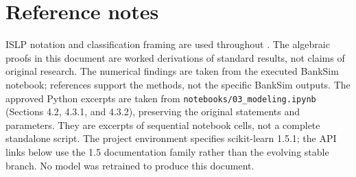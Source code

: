 \documentclass[11pt,a4paper]{article}
\begin{document}
\section*{Reference notes}
ISLP notation and classification framing are used throughout \cite{james2023}. The algebraic proofs in this document are worked derivations of standard results, not claims of original research. The numerical findings are taken from the executed BankSim notebook; references support the methods, not the specific BankSim outputs. The approved Python excerpts are taken from \texttt{notebooks/03\_modeling.ipynb} (Sections 4.2, 4.3.1, and 4.3.2), preserving the original statements and parameters. They are excerpts of sequential notebook cells, not a complete standalone script. The project environment specifies scikit-learn 1.5.1; the API links below use the 1.5 documentation family rather than the evolving stable branch. No model was retrained to produce this document.
\end{document}
